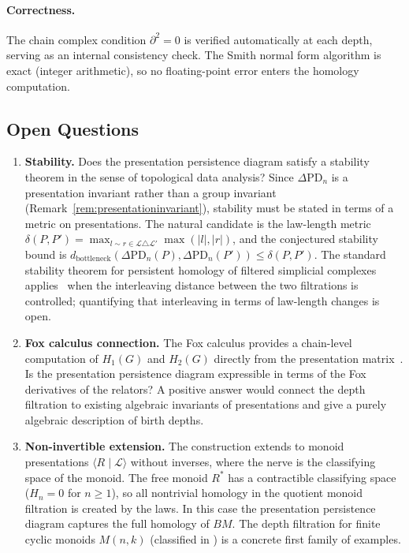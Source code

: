 \documentclass{article}
\theoremstyle{definition}
\theoremstyle{remark}
\begin{document}
\paragraph{Correctness.}
The chain complex condition $\partial^2 = 0$ is verified
automatically at each depth, serving as an internal consistency
check. The Smith normal form algorithm is exact (integer
arithmetic), so no floating-point error enters the homology
computation.

\subsection{Open Questions}
\label{sec:persistent_open}

\begin{enumerate}[label=(Q\arabic*)]
  \item \textbf{Stability.} Does the presentation persistence
        diagram satisfy a stability theorem in the sense of
        topological data analysis? Since $\Delta\mathrm{PD}_n$
        is a presentation invariant rather than a group invariant
        (Remark~\ref{rem:presentationinvariant}), stability must
        be stated in terms of a metric on presentations.
        The natural candidate is the law-length metric
        $\delta(P, P') = \max_{l \sim r \in \mathcal{L} \triangle
        \mathcal{L}'} \max(|l|, |r|)$, and the conjectured
        stability bound is
        $d_{\mathrm{bottleneck}}(\Delta\mathrm{PD}_n(P),
        \Delta\mathrm{PD}_n(P')) \leq \delta(P, P')$.
        The standard stability theorem for persistent homology of
        filtered simplicial complexes applies~\cite{edels_harer}
        when the interleaving distance between the two filtrations
        is controlled; quantifying that interleaving in terms of
        law-length changes is open.

  \item \textbf{Fox calculus connection.} The Fox calculus
        provides a chain-level computation of $H_1(G)$ and $H_2(G)$
        directly from the presentation matrix~\cite{lyndonshupp}.
        Is the presentation persistence diagram expressible in
        terms of the Fox derivatives of the relators? A positive
        answer would connect the depth filtration to existing
        algebraic invariants of presentations and give a purely
        algebraic description of birth depths.

  \item \textbf{Non-invertible extension.} The construction
        extends to monoid presentations $\langle R \mid \mathcal{L}
        \rangle$ without inverses, where the nerve is the
        classifying space of the monoid. The free monoid
        $R^*$ has a contractible classifying space ($H_n = 0$
        for $n \geq 1$), so all nontrivial homology in the
        quotient monoid filtration is created by the laws.
        In this case the presentation persistence diagram
        captures the full homology of $BM$. The depth filtration
        for finite cyclic monoids $M(n,k)$ (classified in
        ) is a concrete
        first family of examples.


\end{enumerate}
\end{document}
